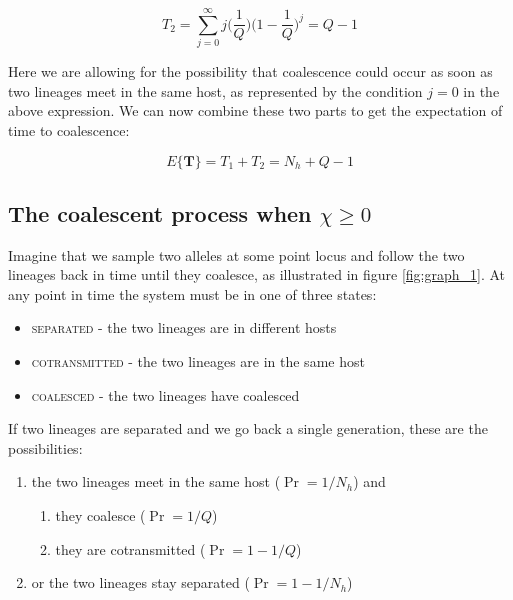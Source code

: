 \documentclass[_main.tex]{subfiles}
\begin{document}
\begin{equation*}
T_2 =
\sum_{j=0}^\infty
j \Big( \frac{1}{Q} \Big)
\Big( 1 - \frac{1}{Q} \Big)^{j}
= Q - 1
\end{equation*}

Here we are allowing for the possibility that coalescence could occur as soon as two lineages meet in the same host, as represented by the condition $j=0$ in the above expression.   We can now combine these two parts to get the expectation of time to coalescence:

\begin{equation*}
E \{ \textbf{T} \}   
= T_1 + T_2
= N_h + Q - 1
\end{equation*}

\subsection{The coalescent process when \texorpdfstring{$\chi \ge 0$}{chi >= 0}}
\label{supp_coalescent}

Imagine that we sample two alleles at some point locus and follow the two lineages back in time until they coalesce, as illustrated in figure \ref{fig:graph_1}.  At any point in time the system must be in one of three states:

\begin{itemize} [noitemsep]

\item \textsc{separated} - the two lineages are in different hosts

\item \textsc{cotransmitted} - the two lineages are in the same host

\item \textsc{coalesced} - the two lineages have coalesced

\end{itemize}

\noindent If two lineages are separated and we go back a single generation, these are the possibilities:

\begin{enumerate}

\item the two lineages meet in the same host ($\Pr = 1/N_h$) and

\begin{enumerate}

\item they coalesce ($\Pr = 1/Q$) 

\item they are cotransmitted ($\Pr = 1 - 1/Q$) 

\end{enumerate}

\item or the two lineages stay separated ($\Pr = 1 -  1/N_h$)

\end{enumerate}
\end{document}
